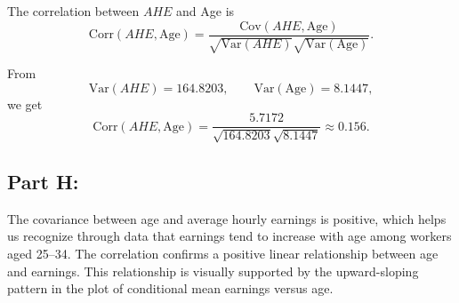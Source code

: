 \documentclass[
]{article}
\begin{document}
The correlation between \(AHE\) and Age is \[
\mathrm{Corr}(AHE,\text{Age})
=\frac{\mathrm{Cov}(AHE,\text{Age})}
{\sqrt{\mathrm{Var}(AHE)}\sqrt{\mathrm{Var}(\text{Age})}}.
\]

From \[
\mathrm{Var}(AHE)=164.8203, 
\qquad 
\mathrm{Var}(\text{Age})=8.1447,
\] we get \[
\mathrm{Corr}(AHE,\text{Age})
=\frac{5.7172}{\sqrt{164.8203}\sqrt{8.1447}}
\approx 0.156.
\]

\subsection{Part H:}\label{part-h}

The covariance between age and average hourly earnings is positive,
which helps us recognize through data that earnings tend to increase
with age among workers aged 25--34. The correlation confirms a positive
linear relationship between age and earnings. This relationship is
visually supported by the upward-sloping pattern in the plot of
conditional mean earnings versus age.
\end{document}
